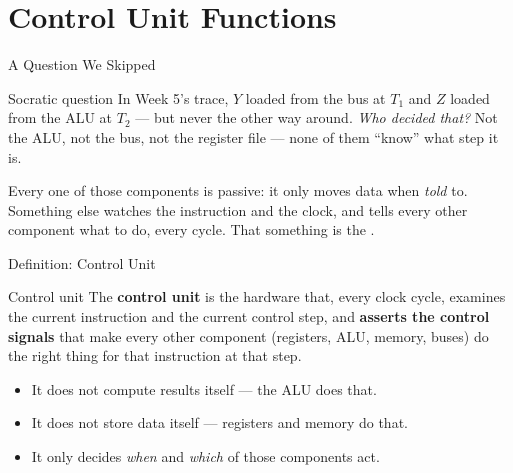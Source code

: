 \documentclass[aspectratio=169]{beamer}
\begin{document}

\section{Control Unit Functions}

\begin{frame}{A Question We Skipped}
  \begin{block}{Socratic question}
    In Week 5's trace, $Y$ loaded from the bus at $T_1$ and $Z$ loaded from the
    ALU at $T_2$ --- but never the other way around. \emph{Who decided that?} Not
    the ALU, not the bus, not the register file --- none of them ``know'' what
    step it is.
  \end{block}
  Every one of those components is passive: it only moves data when \emph{told}
  to. Something else watches the instruction and the clock, and tells every other
  component what to do, every cycle. That something is the .
\end{frame}

\begin{frame}{Definition: Control Unit}
  \begin{block}{Control unit}
    The \textbf{control unit} is the hardware that, every clock cycle, examines
    the current instruction and the current control step, and \textbf{asserts the
    control signals} that make every other component (registers, ALU, memory,
    buses) do the right thing for that instruction at that step.
  \end{block}
  \begin{itemize}
    \item It does not compute results itself --- the ALU does that.
    \item It does not store data itself --- registers and memory do that.
    \item It only decides \emph{when} and \emph{which} of those components act.
  \end{itemize}
\end{frame}
\end{document}
